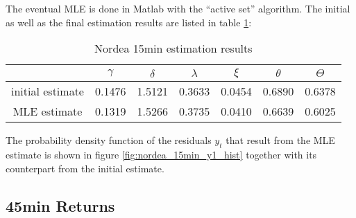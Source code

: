 \documentclass{book}
\begin{document}
The eventual MLE is done in Matlab with the ``active set''
algorithm. The initial as well as the final estimation results are
listed in table \ref{tab:nordea_15min_js_param}:
\begin{table}[htb!]
  \centering
  \begin{tabular}{c|c|c|c|c|c|c}
    & $\gamma$ & $\delta$ & $\lambda$ & $\xi$ & $\theta$ & $\Theta$ \\
    \hline
    initial estimate & 0.1476 & 1.5121 & 0.3633 & 0.0454 & 0.6890 &
    0.6378 \\
    \hline
    MLE estimate & 0.1319 & 1.5266 & 0.3735 & 0.0410 & 0.6639 & 0.6025
  \end{tabular}
  \caption{Nordea 15min estimation results}
  \label{tab:nordea_15min_js_param}
\end{table}

The probability density function of the residuals $y_t$ that result
from the MLE estimate is shown in figure
\ref{fig:nordea_15min_y1_hist} together with its counterpart from the
initial estimate. 
\subsection{45min Returns}




\end{document}
